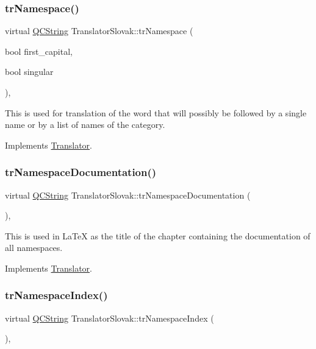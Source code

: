 \subsubsection{\texorpdfstring{trNamespace()}{trNamespace()}}
{\footnotesize\ttfamily virtual \mbox{\hyperlink{class_q_c_string}{Q\+C\+String}} Translator\+Slovak\+::tr\+Namespace (\begin{DoxyParamCaption}\item[{bool}]{first\+\_\+capital,  }\item[{bool}]{singular }\end{DoxyParamCaption})\hspace{0.3cm}{\ttfamily [inline]}, {\ttfamily [virtual]}}

This is used for translation of the word that will possibly be followed by a single name or by a list of names of the category. 

Implements \mbox{\hyperlink{class_translator}{Translator}}.

\mbox{\label{class_translator_slovak_a0258ba3c978a8b01e38dba030e610b09}} 
\subsubsection{\texorpdfstring{trNamespaceDocumentation()}{trNamespaceDocumentation()}}
{\footnotesize\ttfamily virtual \mbox{\hyperlink{class_q_c_string}{Q\+C\+String}} Translator\+Slovak\+::tr\+Namespace\+Documentation (\begin{DoxyParamCaption}{ }\end{DoxyParamCaption})\hspace{0.3cm}{\ttfamily [inline]}, {\ttfamily [virtual]}}

This is used in La\+TeX as the title of the chapter containing the documentation of all namespaces. 

Implements \mbox{\hyperlink{class_translator}{Translator}}.

\mbox{\label{class_translator_slovak_a03542d59e7c631466f94ab75a39b602e}} 
\subsubsection{\texorpdfstring{trNamespaceIndex()}{trNamespaceIndex()}}
{\footnotesize\ttfamily virtual \mbox{\hyperlink{class_q_c_string}{Q\+C\+String}} Translator\+Slovak\+::tr\+Namespace\+Index (\begin{DoxyParamCaption}{ }\end{DoxyParamCaption})\hspace{0.3cm}{\ttfamily [inline]}, {\ttfamily [virtual]}}

